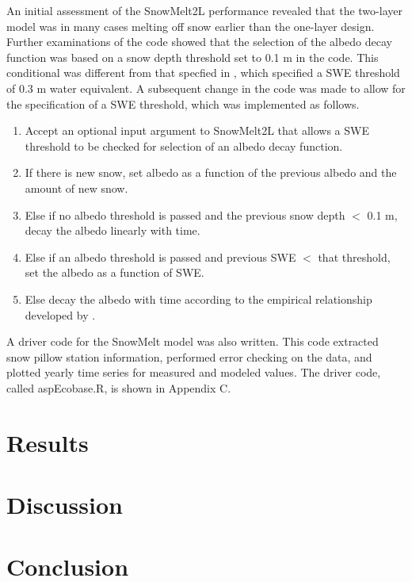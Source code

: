 \documentclass[12pt]{article}
\begin{document}
An initial assessment of the SnowMelt2L performance revealed that the two-layer model was in many cases melting off snow earlier than the one-layer design.
Further examinations of the code showed that the selection of the albedo decay function was based on a snow depth threshold set to 0.1 m in the code.
This conditional was different from that specfied in \citep{walter2005process}, which specified a SWE threshold of 0.3 m water equivalent.
A subsequent change in the code was made to allow for the specification of a SWE threshold, which was implemented as follows.
\begin{enumerate}
  \item Accept an optional input argument to SnowMelt2L that allows a SWE threshold to be checked for selection of an albedo decay function.
  \item If there is new snow, set albedo as a function of the previous albedo and the amount of new snow.
  \item Else if no albedo threshold is passed and the previous snow depth $<$ 0.1 m, decay the albedo linearly with time.
  \item Else if an albedo threshold is passed and previous SWE $<$ that threshold, set the albedo as a function of SWE.
  \item Else decay the albedo with time according to the empirical relationship developed by \citet{armycorps1960runoff}.
\end{enumerate}

A driver code for the SnowMelt model was also written.
This code extracted snow pillow station information, performed error checking on the data, and plotted yearly time series for measured and modeled values.
The driver code, called aspEcobase.R, is shown in Appendix C.



\section{Results}



\section{Discussion}



\section{Conclusion}
\end{document}
